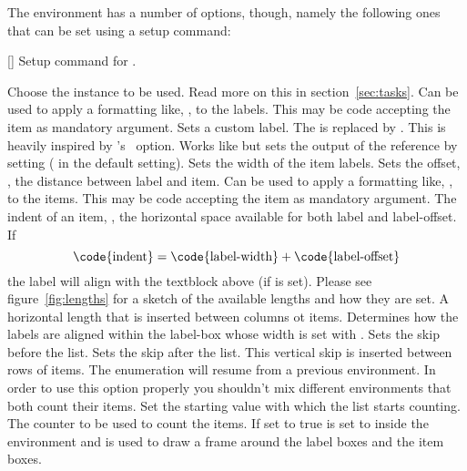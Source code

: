 \documentclass{tasks-manual}
\begin{document}
The environment  has a number of options, though, namely the
following ones that can be set using a setup command:
\begin{commands}
  []
    Setup command for \Tasks.
\end{commands}
\begin{options}
  \Default
     Choose the instance to be used.  Read more on this in
     section~\ref{sec:tasks}.
  \Default
    Can be used to apply a formatting like, \eg,
     to the labels.  This may be code accepting the item as
    mandatory argument.
    Sets a custom label.  The \code{*} is replaced by
    .  This is heavily inspired by
    's~\cite{pkg:enumitem}  option.
  \Default
    Works like  but sets the output of the
    reference by setting  ( in the default
    setting).
  \Default{1em}
    Sets the width of the item labels.
  \Default{.3333em}
    Sets the offset, \ie, the distance between label and
    item.
  \Default
    Can be used to apply a formatting like, \eg,
     to the items. This may be code accepting the item as
    mandatory argument.
  \Default{2.5em}
    The indent of an item, \ie, the horizontal space
    available for both label and label-offset.  If
    \[
      \text{\code{indent}} =
      \text{\code{label-width}} + \text{\code{label-offset}}
    \]
    the label will align with the textblock above (if
     is set).  Please see figure~\ref{fig:lengths}
    for a sketch of the available lengths and how they are set.
  \Default{0pt}
    A horizontal length that is inserted between columns ot
    items.
    Determines how the labels are aligned within the
    label-box whose width is set with .
  \Default{0pt}
    Sets the skip before the list.
  \Default{0pt}
    Sets the skip after the list.
    This vertical skip is inserted between rows of items.
    The enumeration will resume from a previous  environment.  In
    order to use this option properly you shouldn't mix different 
    environments that both count their items.
    Set the starting value with which the list starts
    counting.
    The counter to be used to count the items.
    If set to true  is set to \code{0pt}
    inside the  environment and  is used to draw a frame
    around the label boxes and the item boxes.
\end{options}
\end{document}
